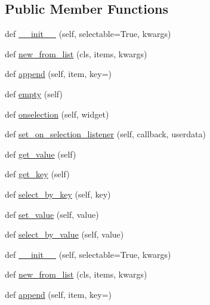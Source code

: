 \subsection*{Public Member Functions}
\begin{DoxyCompactItemize}
\item 
def \hyperlink{classremi_1_1gui_1_1ListView_a0d33a469484fe97d78e7122ee04dd8e7}{\+\_\+\+\_\+init\+\_\+\+\_\+} (self, selectable=True, kwargs)
\item 
def \hyperlink{classremi_1_1gui_1_1ListView_aaf113567a3811e687eee0a7b70d49f95}{new\+\_\+from\+\_\+list} (cls, items, kwargs)
\item 
def \hyperlink{classremi_1_1gui_1_1ListView_af7deb210e778936cd09bc665de7ada81}{append} (self, item, key=\textquotesingle{}\textquotesingle{})
\item 
def \hyperlink{classremi_1_1gui_1_1ListView_a8142a456f56465229168e7910b2a5406}{empty} (self)
\item 
def \hyperlink{classremi_1_1gui_1_1ListView_adcdc5be097dc81ce9e96b36adeb63d1c}{onselection} (self, widget)
\item 
def \hyperlink{classremi_1_1gui_1_1ListView_aae509720cebc82534989b955bcbc82c8}{set\+\_\+on\+\_\+selection\+\_\+listener} (self, callback, userdata)
\item 
def \hyperlink{classremi_1_1gui_1_1ListView_ad729d9dc0f1e6fd8c42e3f0205c0efc7}{get\+\_\+value} (self)
\item 
def \hyperlink{classremi_1_1gui_1_1ListView_ae916dd25166229d79ed619bf51bfad10}{get\+\_\+key} (self)
\item 
def \hyperlink{classremi_1_1gui_1_1ListView_aedfdc65ab96226786f68bbab0d1c1eec}{select\+\_\+by\+\_\+key} (self, key)
\item 
def \hyperlink{classremi_1_1gui_1_1ListView_a2691e177503dde04d12b1312b597a9ec}{set\+\_\+value} (self, value)
\item 
def \hyperlink{classremi_1_1gui_1_1ListView_a9be5a47ec5d98915429a3486b8611f1f}{select\+\_\+by\+\_\+value} (self, value)
\item 
def \hyperlink{classremi_1_1gui_1_1ListView_a0d33a469484fe97d78e7122ee04dd8e7}{\+\_\+\+\_\+init\+\_\+\+\_\+} (self, selectable=True, kwargs)
\item 
def \hyperlink{classremi_1_1gui_1_1ListView_aaf113567a3811e687eee0a7b70d49f95}{new\+\_\+from\+\_\+list} (cls, items, kwargs)
\item 
def \hyperlink{classremi_1_1gui_1_1ListView_af7deb210e778936cd09bc665de7ada81}{append} (self, item, key=\textquotesingle{}\textquotesingle{})

\end{DoxyCompactItemize}
